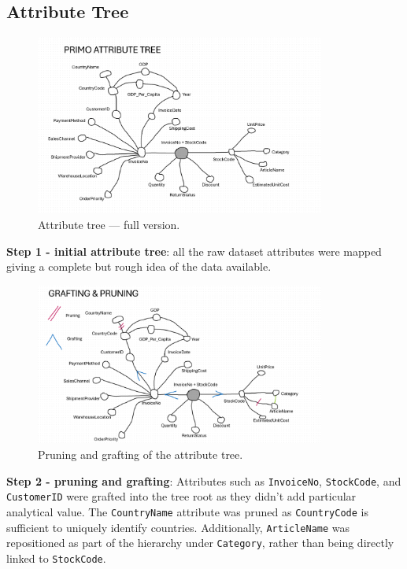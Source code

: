 \documentclass[a4paper,11pt]{article}
\begin{document}
\subsection{Attribute Tree}
\begin{figure}[H]
\centering
\includegraphics[width=0.85\textwidth]{../Graphs/1_Attribute_Tree.png}
\caption{Attribute tree — full version.}
\label{fig:attribute_tree_full}
\end{figure}

\textbf{Step 1 - initial attribute tree}: all the raw dataset attributes were mapped giving a complete but rough idea of the data available. 

\begin{figure}[H]
\centering
\includegraphics[width=0.85\textwidth]{../Graphs/2_Attribute_Tree_Pruning_Grafting.png}
\caption{Pruning and grafting of the attribute tree.}
\label{fig:attribute_tree_pruning_grafting}
\end{figure}

\textbf{Step 2 - pruning and grafting}: Attributes such as \texttt{InvoiceNo}, \texttt{StockCode}, and \texttt{CustomerID} were grafted into the tree root as they didn't add particular analytical value.
The \texttt{CountryName} attribute was pruned as \texttt{CountryCode} is sufficient to uniquely identify countries.
Additionally, \texttt{ArticleName} was repositioned as part of the hierarchy under \texttt{Category}, rather than being directly linked to \texttt{StockCode}.
\end{document}
